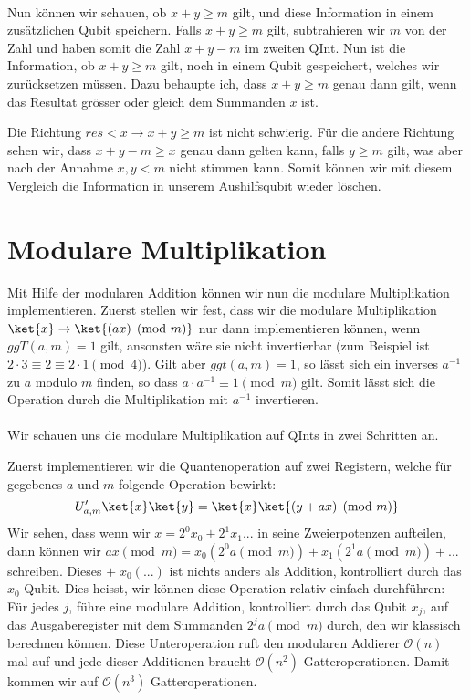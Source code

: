\paragraph{}

Nun können wir schauen, ob $x + y \geq m$ gilt, und diese Information in einem zusätzlichen Qubit speichern. Falls $x + y \geq m$ gilt, subtrahieren wir $m$ von der Zahl und haben somit die Zahl $x + y - m$ im zweiten QInt. Nun ist die Information, ob $x + y \geq m$ gilt, noch in einem Qubit gespeichert, welches wir zurücksetzen müssen. Dazu behaupte ich, dass $x + y \geq m$ genau dann gilt, wenn das Resultat grösser oder gleich dem Summanden $x$ ist. 

Die Richtung $res < x \rightarrow x + y \geq m$ ist nicht schwierig. Für die andere Richtung sehen wir, dass $x + y - m \geq x$ genau dann gelten kann, falls $y \geq m$ gilt, was aber nach der Annahme $x, y < m$ nicht stimmen kann. Somit können wir mit diesem Vergleich die Information in unserem Aushilfsqubit wieder löschen.

\section{Modulare Multiplikation}
Mit Hilfe der modularen Addition können wir nun die modulare Multiplikation implementieren. Zuerst stellen wir fest, dass wir die modulare Multiplikation $\ket{x} \rightarrow \ket{(ax) \pmod{m}}$ nur dann implementieren können, wenn $ggT(a, m) = 1$ gilt, ansonsten wäre sie nicht invertierbar (zum Beispiel ist $2\cdot 3 \equiv 2 \equiv 2\cdot 1 \pmod{4}$). Gilt aber $ggt(a, m) = 1$, so lässt sich ein inverses $a^{-1}$ zu $a$ modulo $m$ finden, so dass $a\cdot a^{-1} \equiv 1 \pmod{m}$ gilt. Somit lässt sich die Operation durch die Multiplikation mit $a^{-1}$ invertieren.

\paragraph{}

Wir schauen uns die modulare Multiplikation auf QInts in zwei Schritten an.

\noindent Zuerst implementieren wir die Quantenoperation auf zwei Registern, welche für gegebenes $a$ und $m$ folgende Operation bewirkt: $$U'_{a, m}\ket{x}\ket{y} = \ket{x}\ket{(y + ax) \pmod{m}}$$
Wir sehen, dass wenn wir $x = 2^0 x_0 + 2^1 x_1 ...$ in seine Zweierpotenzen aufteilen, dann können wir $ax \pmod{m} = x_0(2^0 a \pmod{m}) + x_1(2^1 a \pmod{m}) + ...$ schreiben. Dieses $+ \;x_0(...)$ ist nichts anders als Addition, kontrolliert durch das $x_0$ Qubit. Dies heisst, wir können diese Operation relativ einfach durchführen: \newline
Für jedes $j$, führe eine modulare Addition, kontrolliert durch das Qubit $x_j$, auf das Ausgaberegister mit dem Summanden $2^ja \pmod{m}$ durch, den wir klassisch berechnen können. \newline
Diese Unteroperation ruft den modularen Addierer $\mathcal O(n)$ mal auf und jede dieser Additionen braucht $\mathcal O(n^2)$ Gatteroperationen. Damit kommen wir auf $\mathcal O(n^3)$ Gatteroperationen.


